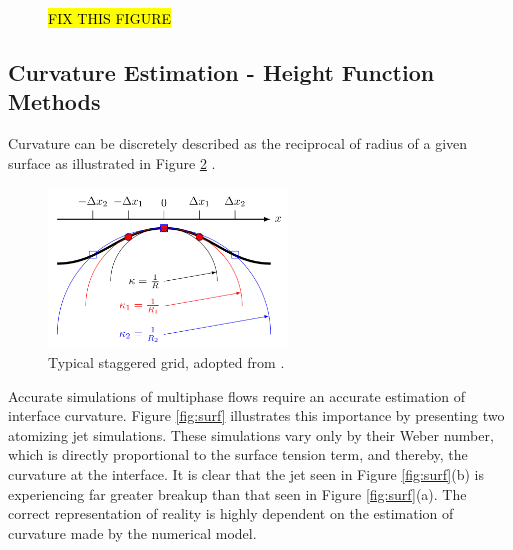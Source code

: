\begin{figure}[htbp]
		\caption{\hl{FIX THIS FIGURE}}
	\label{fig:rudmesh}
\end{figure}

\subsection{Curvature Estimation - Height Function Methods}

Curvature can be discretely described as the reciprocal of radius of a given surface as illustrated in Figure \ref{fig:curv} \cite{MARK2013}. 

 \begin{figure}[htbp]
	\centering
	\includegraphics[width=2.5in]{figs/curv}
	\caption{Typical staggered grid, adopted from \cite{TRYG}.}
	\label{fig:curv}
\end{figure}

\noindent Accurate simulations of multiphase flows require an accurate estimation of interface curvature. Figure \ref{fig:surf} illustrates this importance by presenting two atomizing jet simulations. These simulations vary only by their Weber number, which is directly proportional to the surface tension term, and thereby, the curvature at the interface. It is clear that the jet seen in Figure \ref{fig:surf}(b) is experiencing far greater breakup than that seen in Figure \ref{fig:surf}(a). The correct representation of reality is highly dependent on the estimation of curvature made by the numerical model. 

